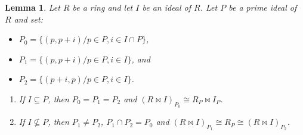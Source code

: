 \documentclass{amsart}
\newtheorem{lemma}[theorem]{Lemma}
\theoremstyle{definition}
\theoremstyle{remark}
\theoremstyle{Definition and Notation}
\begin{document}
\begin{lemma} \cite[Proposition 7]{A} \label{2}
 Let $R$  be a  ring  and let  $I$ be an ideal
 of $R$. Let $P$ be a prime ideal of $R$ and set:
\begin{itemize}
    \item $P_{0}=\{(p,p+i)/p\in P,i\in I\cap P\}$,
    \item $P_{1}=\{(p,p+i)/p\in P,i\in I\}$, and
    \item $P_{2}=\{(p+i,p)/p\in P,i\in I\}$.
\end{itemize}

\begin{enumerate}
    \item If $I\subseteq P$, then $P_{0}=P_{1}=P_{2}$ and $(R\bowtie I)_{P_{0}}\cong R_{P}\bowtie
    I_{P}$.
    \item If $I\nsubseteq P$, then $P_{1}\neq P_{2}$, $P_{1}\cap
    P_{2}=P_{0}$ and $(R\bowtie I)_{P_{1}}\cong R_{P} \cong (R\bowtie
    I)_{P_{2}}$.
\end{enumerate}
\end{lemma}
\end{document}

